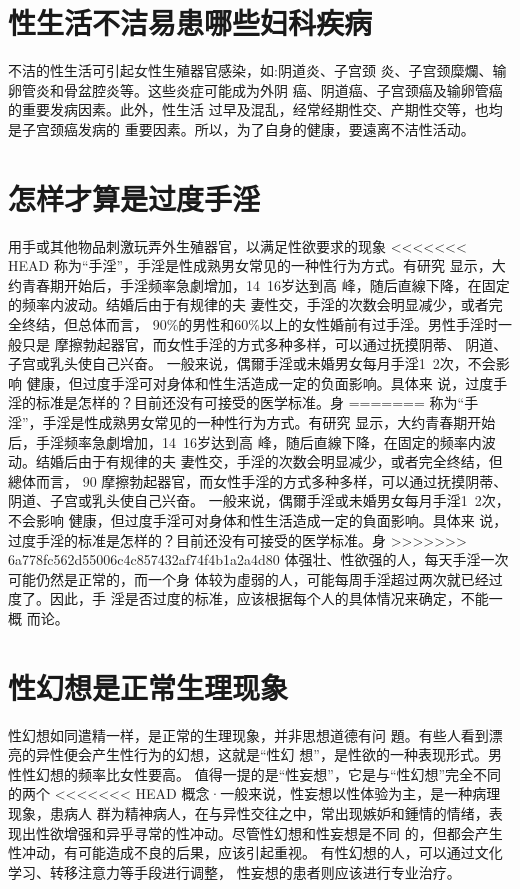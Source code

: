 \documentclass[12pt,UTF8]{ctexbook}
\begin{document}
\section{性生活不洁易患哪些妇科疾病}

不洁的性生活可引起女性生殖器官感染，如:阴道炎、子宫颈
炎、子宫颈糜爛、输卵管炎和骨盆腔炎等。这些炎症可能成为外阴
癌、阴道癌、子宫颈癌及输卵管癌的重要发病因素。此外，性生活
过早及混乱，经常经期性交、产期性交等，也均是子宫颈癌发病的
重要因素。所以，为了自身的健康，要遠离不洁性活动。

\section{怎样才算是过度手淫}

用手或其他物品刺激玩弄外生殖器官，以满足性欲要求的现象
<<<<<<< HEAD
称为“手淫”，手淫是性成熟男女常见的一种性行为方式。有研究
显示，大约青春期开始后，手淫频率急劇增加，14~16岁达到高
峰，随后直線下降，在固定的频率内波动。结婚后由于有规律的夫
妻性交，手淫的次数会明显减少，或者完全终结，但总体而言，
90\%的男性和60\%以上的女性婚前有过手淫。男性手淫时一般只是
摩擦勃起器官，而女性手淫的方式多种多样，可以通过抚摸阴蒂、
阴道、子宫或乳头使自己兴奋。
一般来说，偶爾手淫或未婚男女每月手淫1~2次，不会影响
健康，但过度手淫可对身体和性生活造成一定的负面影响。具体来
说，过度手淫的标准是怎样的？目前还没有可接受的医学标准。身
=======
称为“手淫”，手淫是性成熟男女常见的一种性行为方式。有研究
显示，大约青春期开始后，手淫频率急劇增加，14~16岁达到高
峰，随后直線下降，在固定的频率内波动。结婚后由于有规律的夫
妻性交，手淫的次数会明显减少，或者完全终结，但總体而言，
90%
摩擦勃起器官，而女性手淫的方式多种多样，可以通过抚摸阴蒂、
阴道、子宫或乳头使自己兴奋。
一般来说，偶爾手淫或未婚男女每月手淫1~2次，不会影响
健康，但过度手淫可对身体和性生活造成一定的負面影响。具体来
说，过度手淫的标准是怎样的？目前还没有可接受的医学标准。身
>>>>>>> 6a778fc562d55006c4c857432af74f4b1a2a4d80
体强壮、性欲强的人，每天手淫一次可能仍然是正常的，而一个身
体较为虛弱的人，可能每周手淫超过两次就已经过度了。因此，手
淫是否过度的标准，应该根据每个人的具体情况来确定，不能一概
而论。
\section{性幻想是正常生理现象}
性幻想如同遣精一样，是正常的生理现象，并非思想道德有问
題。有些人看到漂亮的异性便会产生性行为的幻想，这就是“性幻
想”，是性欲的一种表现形式。男性性幻想的频率比女性要高。
值得一提的是“性妄想”，它是与“性幻想”完全不同的两个
<<<<<<< HEAD
概念·一般来说，性妄想以性体验为主，是一种病理现象，患病人
群为精神病人，在与异性交往之中，常出现嫉妒和鍾情的情绪，表
现出性欲增强和异乎寻常的性冲动。尽管性幻想和性妄想是不同
的，但都会产生性冲动，有可能造成不良的后果，应该引起重视。
有性幻想的人，可以通过文化学习、转移注意力等手段进行调整，
性妄想的患者则应该进行专业治疗。
\end{document}
